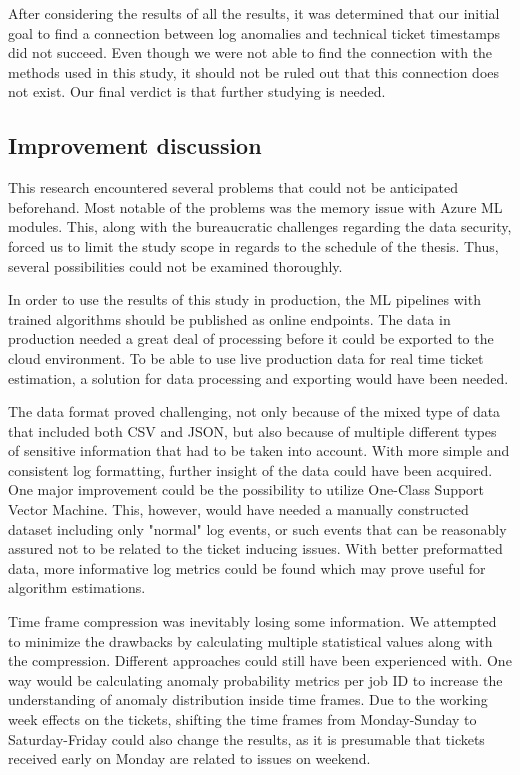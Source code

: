 After considering the results of all the results,
it was determined that our initial goal to find a connection between log anomalies and technical ticket timestamps
did not succeed.
Even though we were not able to find the connection with the methods used in this study,
it should not be ruled out that this connection does not exist.
Our final verdict is that further studying is needed.


\subsection{Improvement discussion}\label{subsec:discussion}

This research encountered several problems
that could not be anticipated beforehand.
Most notable of the problems was the memory issue
with Azure ML modules.
This,
along with the bureaucratic challenges regarding the data security,
forced us to limit the study scope in regards to the schedule of the thesis.
Thus,
several possibilities could not be examined thoroughly.

In order to use the results of this study in production,
the ML pipelines with trained algorithms should be published as online endpoints.
The data in production needed a great deal of processing before
it could be exported to the cloud environment.
To be able to use live production data for real time ticket estimation,
a solution for data processing and exporting would have been needed.

The data format proved challenging,
not only because of the mixed type of data that included both CSV and JSON,
but also because of multiple different types of sensitive information
that had to be taken into account.
With more simple and consistent log formatting,
further insight of the data could have been acquired.
One major improvement could be the possibility to utilize One-Class Support Vector Machine.
This, however,
would have needed a manually constructed dataset
including only "normal" log events,
or such events that can be reasonably assured
not to be related to the ticket inducing issues.
With better preformatted data,
more informative log metrics could be found
which may prove useful for algorithm estimations.

Time frame compression was inevitably losing some information.
We attempted to minimize the drawbacks
by calculating multiple statistical values along with the compression.
Different approaches could still have been experienced with.
One way would be calculating anomaly probability metrics per job ID
to increase the understanding of anomaly distribution inside time frames.
Due to the working week effects on the tickets,
shifting the time frames from Monday-Sunday to Saturday-Friday
could also change the results,
as it is presumable that tickets received early on Monday
are related to issues on weekend.

